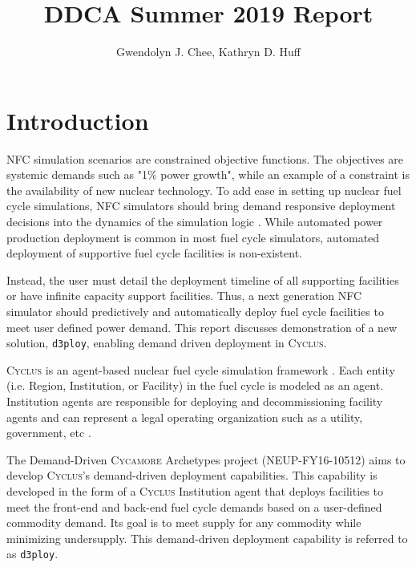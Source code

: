 \documentclass[11pt,letterpaper]{article}
\title{DDCA Summer 2019 Report}
\author{Gwendolyn J. Chee, Kathryn D. Huff}
\newcommand{\Cyclus}{\textsc{Cyclus}\xspace}%
\newcommand{\Cycamore}{\textsc{Cycamore}\xspace}%
\newcommand{\deploy}{\texttt{d3ploy}\xspace}%
\begin{document}
	\begin{titlepage}
	\maketitle
	\thispagestyle{empty}
	\end{titlepage}

\section{Introduction}
\gls{NFC} simulation scenarios are constrained objective functions. 
The objectives are systemic demands such as "1\% power growth", 
while an example of a constraint is the availability of new nuclear 
technology. 
To add ease in setting up nuclear fuel cycle simulations, \gls{NFC}
simulators should bring demand responsive deployment decisions into 
the dynamics of the simulation logic \cite{huff_current_2017}. 
While automated power production deployment is common in most fuel 
cycle simulators, automated deployment of supportive fuel cycle 
facilities is non-existent. 

Instead, the user must detail the deployment timeline of all 
supporting facilities or have infinite capacity support facilities. 
Thus, a next generation \gls{NFC} simulator should predictively and 
automatically deploy fuel cycle facilities to meet user defined 
power demand. 
This report discusses demonstration of a new solution, 
\texttt{d3ploy}, enabling demand driven deployment in \Cyclus. 

\Cyclus is an agent-based nuclear fuel cycle simulation framework 
\cite{huff_fundamental_2016}. 
Each entity (i.e. Region, Institution, or Facility) in the fuel 
cycle is modeled as an agent. 
Institution agents
are responsible for deploying and decommissioning facility agents 
and can represent a legal operating organization such as a 
utility, government, etc \cite{huff_fundamental_2016}. 

The Demand-Driven \Cycamore Archetypes project (NEUP-FY16-10512) 
aims to develop \Cyclus's demand-driven deployment capabilities. 
This capability is developed in the form of a \Cyclus Institution
agent that deploys facilities to meet the front-end and back-end 
fuel cycle demands based on a user-defined commodity demand. 
Its goal is to meet supply for any commodity while minimizing 
undersupply.
This demand-driven deployment capability is referred to as 
\deploy. 
\end{document}
